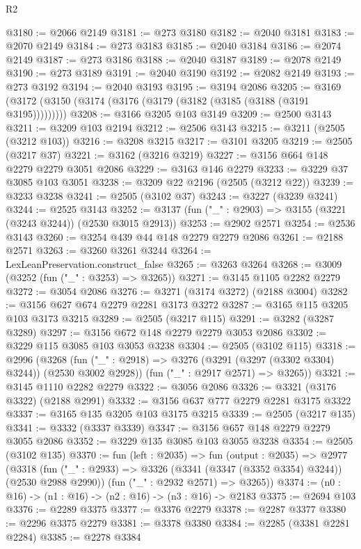 \begin{lexlean}{R2}
\begin{coremodule}
@3180 := @2066 @2149
@3181 := @273 @3180
@3182 := @2040 @3181
@3183 := @2070 @2149
@3184 := @273 @3183
@3185 := @2040 @3184
@3186 := @2074 @2149
@3187 := @273 @3186
@3188 := @2040 @3187
@3189 := @2078 @2149
@3190 := @273 @3189
@3191 := @2040 @3190
@3192 := @2082 @2149
@3193 := @273 @3192
@3194 := @2040 @3193
@3195 := @3194 @2086
@3205 := @3169 (@3172 (@3150 (@3174 (@3176 (@3179 (@3182 (@3185 (@3188 (@3191 @3195)))))))))
@3208 := @3166 @3205 @103 @3149
@3209 := @2500 @3143
@3211 := @3209 @103 @2194
@3212 := @2506 @3143
@3215 := @3211 (@2505 (@3212 @103))
@3216 := @3208 @3215
@3217 := @3101 @3205
@3219 := @2505 (@3217 @37)
@3221 := @3162 (@3216 @3219)
@3227 := @3156 @664 @148 @2279 @2279 @3051 @2086
@3229 := @3163 @146 @2279
@3233 := @3229 @37 @3085 @103 @3051
@3238 := @3209 @22 @2196 (@2505 (@3212 @22))
@3239 := @3233 @3238
@3241 := @2505 (@3102 @37)
@3243 := @3227 (@3239 @3241)
@3244 := @2525 @3143
@3252 := @3137 (fun ("_" : @2903) => @3155 (@3221 (@3243 @3244)) (@2530 @3015 @2913))
@3253 := @2902 @2571
@3254 := @2536 @3143
@3260 := @3254 @439 @44 @148 @2279 @2279 @2086
@3261 := @2188 @2571
@3263 := @3260 @3261 @3244
@3264 := LexLeanPreservation.construct_false
@3265 := @3263 @3264
@3268 := @3009 (@3252 (fun ("_" : @3253) => @3265))
@3271 := @3145 @1105 @2282 @2279
@3272 := @3054 @2086
@3276 := @3271 (@3174 @3272) (@2188 @3004)
@3282 := @3156 @627 @674 @2279 @2281 @3173 @3272
@3287 := @3165 @115 @3205 @103 @3173 @3215
@3289 := @2505 (@3217 @115)
@3291 := @3282 (@3287 @3289)
@3297 := @3156 @672 @148 @2279 @2279 @3053 @2086
@3302 := @3229 @115 @3085 @103 @3053 @3238
@3304 := @2505 (@3102 @115)
@3318 := @2996
    (@3268
      (fun ("_" : @2918) => @3276 (@3291 (@3297 (@3302 @3304) @3244)) (@2530 @3002 @2928))
      (fun ("_" : @2917 @2571) => @3265))
@3321 := @3145 @1110 @2282 @2279
@3322 := @3056 @2086
@3326 := @3321 (@3176 @3322) (@2188 @2991)
@3332 := @3156 @637 @777 @2279 @2281 @3175 @3322
@3337 := @3165 @135 @3205 @103 @3175 @3215
@3339 := @2505 (@3217 @135)
@3341 := @3332 (@3337 @3339)
@3347 := @3156 @657 @148 @2279 @2279 @3055 @2086
@3352 := @3229 @135 @3085 @103 @3055 @3238
@3354 := @2505 (@3102 @135)
@3370 := fun (left : @2035) =>
  fun (output : @2035) =>
  @2977
    (@3318
      (fun ("_" : @2933) => @3326 (@3341 (@3347 (@3352 @3354) @3244)) (@2530 @2988 @2990))
      (fun ("_" : @2932 @2571) => @3265))
@3374 := (n0 : @16) -> (n1 : @16) -> (n2 : @16) -> (n3 : @16) -> @2183
@3375 := @2694 @103
@3376 := @2289 @3375
@3377 := @3376 @2279
@3378 := @2287 @3377
@3380 := @2296 @3375 @2279
@3381 := @3378 @3380
@3384 := @2285 (@3381 @2281 @2284)
@3385 := @2278 @3384

\end{coremodule}
\end{lexlean}
